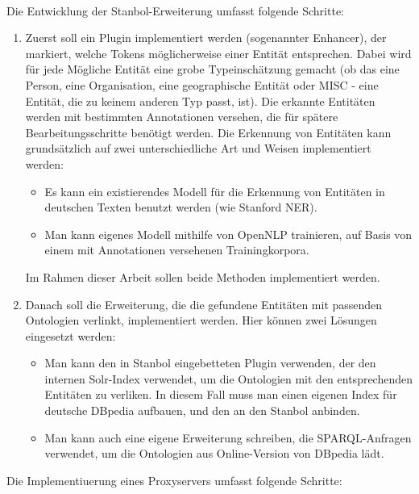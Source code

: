 \paragraph{}
Die Entwicklung der Stanbol-Erweiterung umfasst folgende Schritte:
\begin{enumerate}
\item Zuerst soll ein Plugin implementiert werden (sogenannter Enhancer), der markiert, welche Tokens möglicherweise einer Entität entsprechen. Dabei wird für jede Mögliche Entität eine grobe Typeinschätzung gemacht (ob das eine Person, eine Organisation, eine geographische Entität oder MISC - eine Entität, die zu keinem anderen Typ passt, ist). Die erkannte Entitäten werden mit bestimmten Annotationen versehen, die für spätere Bearbeitungsschritte benötigt werden. Die Erkennung von Entitäten kann grundsätzlich auf zwei unterschiedliche Art und Weisen implementiert werden:  
\begin{itemize}
\item Es kann ein existierendes Modell für die Erkennung von Entitäten in deutschen Texten benutzt werden (wie Stanford NER).
\item Man kann eigenes Modell mithilfe von OpenNLP trainieren, auf Basis von einem mit Annotationen versehenen Trainingkorpora.
\end{itemize}
Im Rahmen dieser Arbeit sollen beide Methoden implementiert werden.

\item Danach soll die Erweiterung, die die gefundene Entitäten mit passenden Ontologien verlinkt, implementiert werden. Hier können zwei Lösungen eingesetzt werden:
\begin{itemize}
\item Man kann den in Stanbol eingebetteten Plugin verwenden, der den internen Solr-Index verwendet, um die Ontologien mit den entsprechenden Entitäten zu verliken. In diesem Fall muss man einen eigenen Index für deutsche DBpedia aufbauen, und den an den Stanbol anbinden.
\item Man kann auch eine eigene Erweiterung schreiben, die SPARQL-Anfragen verwendet, um die Ontologien aus Online-Version von DBpedia lädt.
\end{itemize}
\end{enumerate}

Die Implementiuerung eines Proxyservers umfasst folgende Schritte:

